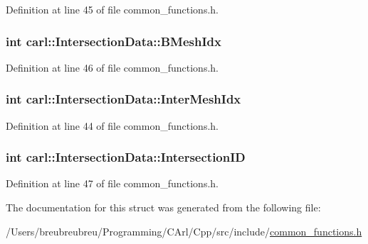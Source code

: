 Definition at line 45 of file common\+\_\+functions.\+h.

\hypertarget{structcarl_1_1_intersection_data_a17a525c08eca43d3e845711ec0d61ecd}{}
\subsubsection[{B\+Mesh\+Idx}]{\setlength{\rightskip}{0pt plus 5cm}int carl\+::\+Intersection\+Data\+::\+B\+Mesh\+Idx}\label{structcarl_1_1_intersection_data_a17a525c08eca43d3e845711ec0d61ecd}


Definition at line 46 of file common\+\_\+functions.\+h.

\hypertarget{structcarl_1_1_intersection_data_a5c47db4bdae8b27a4de3cb4ae6f150ad}{}
\subsubsection[{Inter\+Mesh\+Idx}]{\setlength{\rightskip}{0pt plus 5cm}int carl\+::\+Intersection\+Data\+::\+Inter\+Mesh\+Idx}\label{structcarl_1_1_intersection_data_a5c47db4bdae8b27a4de3cb4ae6f150ad}


Definition at line 44 of file common\+\_\+functions.\+h.

\hypertarget{structcarl_1_1_intersection_data_af7f0f2efa3bf04a035def30e1c48b830}{}
\subsubsection[{Intersection\+I\+D}]{\setlength{\rightskip}{0pt plus 5cm}int carl\+::\+Intersection\+Data\+::\+Intersection\+I\+D}\label{structcarl_1_1_intersection_data_af7f0f2efa3bf04a035def30e1c48b830}


Definition at line 47 of file common\+\_\+functions.\+h.



The documentation for this struct was generated from the following file\+:\begin{DoxyCompactItemize}
\item 
/\+Users/breubreubreu/\+Programming/\+C\+Arl/\+Cpp/src/include/\hyperlink{common__functions_8h}{common\+\_\+functions.\+h}\end{DoxyCompactItemize}
